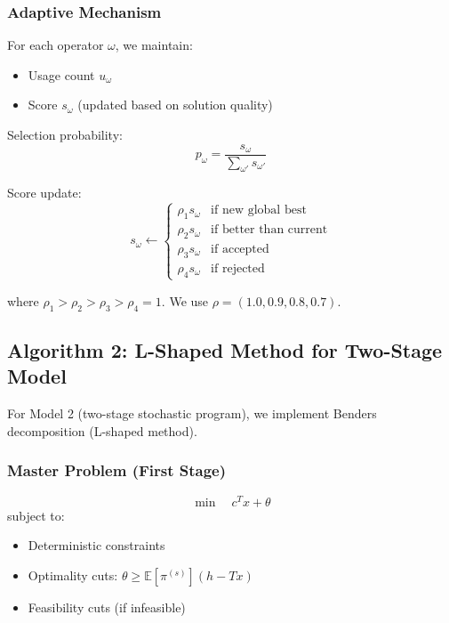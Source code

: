 \subsubsection{Adaptive Mechanism}

For each operator $\omega$, we maintain:
\begin{itemize}
\item Usage count $u_\omega$
\item Score $s_\omega$ (updated based on solution quality)
\end{itemize}

Selection probability:
\begin{equation}
p_\omega = \frac{s_\omega}{\sum_{\omega'} s_{\omega'}}
\end{equation}

Score update:
\begin{equation}
s_\omega \leftarrow \begin{cases}
\rho_1 s_\omega & \text{if new global best} \\
\rho_2 s_\omega & \text{if better than current} \\
\rho_3 s_\omega & \text{if accepted} \\
\rho_4 s_\omega & \text{if rejected}
\end{cases}
\end{equation}

where $\rho_1 > \rho_2 > \rho_3 > \rho_4 = 1$. We use $\rho = (1.0, 0.9, 0.8, 0.7)$.

\subsection{Algorithm 2: L-Shaped Method for Two-Stage Model}

For Model 2 (two-stage stochastic program), we implement Benders decomposition (L-shaped method).

\subsubsection{Master Problem (First Stage)}

\begin{equation}
\min \quad c^T x + \theta
\end{equation}
subject to:
\begin{itemize}
\item Deterministic constraints
\item Optimality cuts: $\theta \geq \mathbb{E}[\pi^{(s)}] (h - Tx)$
\item Feasibility cuts (if infeasible)
\end{itemize}

